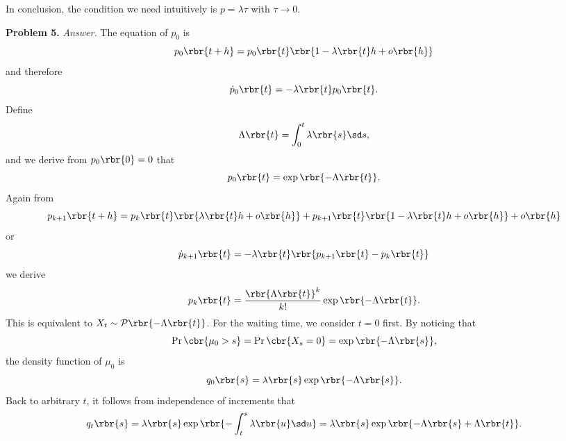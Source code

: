 \documentclass[english, nochinese]{pnote}
\DeclareMathOperator\oppr{\mathrm{Pr}}
\begin{document}
In conclusion, the condition we need intuitively is $ p = \lambda \tau $ with $ \tau \rightarrow 0 $.

\textbf{Problem 5.} \textit{Answer.} The equation of $p_0$ is
\begin{equation}
p_0 \rbr{ t + h } = p_0 \rbr{t} \rbr{ 1 - \lambda \rbr{t} h + o \rbr{h} }
\end{equation}
and therefore
\begin{equation}
\dot{p}_0 \rbr{t} = -\lambda \rbr{t} p_0 \rbr{t}.
\end{equation}
Define
\begin{equation}
\Lambda \rbr{t} = \int_0^t \lambda \rbr{s} \sd s,
\end{equation}
and we derive from $ p_0 \rbr{0} = 0 $ that
\begin{equation}
p_0 \rbr{t} = \exp \rbr{ -\Lambda \rbr{t} }.
\end{equation}
Again from
\begin{equation}
p_{ k + 1 } \rbr{ t + h } = p_k \rbr{t} \rbr{ \lambda \rbr{t} h + o \rbr{h} } + p_{ k + 1 } \rbr{t} \rbr{ 1 - \lambda \rbr{t} h + o \rbr{h} } + o \rbr{h}
\end{equation}
or
\begin{equation}
\dot{p}_{ k + 1 } \rbr{t} = - \lambda \rbr{t} \rbr{ p_{ k + 1 } \rbr{t} - p_k \rbr{t} }
\end{equation}
we derive
\begin{equation}
p_k \rbr{t} = \frac{\rbr{ \Lambda \rbr{t} }^k}{ k ! } \exp \rbr{ -\Lambda \rbr{t} }.
\end{equation}
This is equivalent to $ X_t \sim \mathcal{P} \rbr{ -\Lambda \rbr{t} } $. For the waiting time, we consider $ t = 0 $ first. By noticing that
\begin{equation}
\oppr \cbr{ \mu_0 > s } = \oppr \cbr{ X_s = 0 } = \exp \rbr{ -\Lambda \rbr{s} },
\end{equation}
the density function of $\mu_0$ is
\begin{equation}
q_0 \rbr{s} = \lambda \rbr{s} \exp \rbr{ -\Lambda \rbr{s} }.
\end{equation}
Back to arbitrary $t$, it follows from independence of increments that
\begin{equation}
q_t \rbr{s} = \lambda \rbr{s} \exp \rbr{ -\int_t^s \lambda \rbr{u} \sd u } = \lambda \rbr{s} \exp \rbr{ -\Lambda \rbr{s} + \Lambda \rbr{t} }.
\end{equation}
\end{document}
